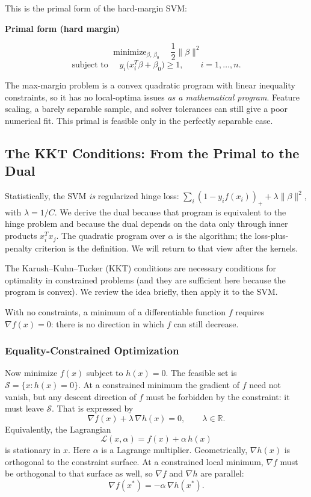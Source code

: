 \documentclass[
]{book}
\begin{document}
This is the primal form of the hard-margin SVM:

\textbf{Primal form (hard margin)}

\[
\operatorname{minimize}_{\beta,\,\beta_0}\quad \frac12\|\beta\|^2
\]
\[
\text{subject to }\quad
y_i\bigl(x_i^T\beta+\beta_0\bigr)\ge 1,\qquad i=1,\ldots,n.
\]

The max-margin problem is a convex quadratic program with linear inequality constraints, so it has no local-optima issues \emph{as a mathematical program}. Feature scaling, a barely separable sample, and solver tolerances can still give a poor numerical fit. This primal is feasible only in the perfectly separable case.

\subsection{The KKT Conditions: From the Primal to the Dual}\label{the-kkt-conditions-from-the-primal-to-the-dual}

Statistically, the SVM \emph{is} regularized hinge loss: \(\sum_i(1-y_i f(x_i))_+ + \lambda\|\beta\|^2\), with \(\lambda=1/C\). We derive the dual because that program is equivalent to the hinge problem and because the dual depends on the data only through inner products \(x_i^T x_j\). The quadratic program over \(\alpha\) is the algorithm; the loss-plus-penalty criterion is the definition. We will return to that view after the kernels.

The Karush--Kuhn--Tucker (KKT) conditions are necessary conditions for optimality in constrained problems (and they are sufficient here because the program is convex). We review the idea briefly, then apply it to the SVM.

With no constraints, a minimum of a differentiable function \(f\) requires \(\nabla f(x)=0\): there is no direction in which \(f\) can still decrease.

\subsubsection*{Equality-Constrained Optimization}\label{equality-constrained-optimization}

Now minimize \(f(x)\) subject to \(h(x)=0\). The feasible set is \(\mathcal{S}=\{x:h(x)=0\}\). At a constrained minimum the gradient of \(f\) need not vanish, but any descent direction of \(f\) must be forbidden by the constraint: it must leave \(\mathcal{S}\). That is expressed by
\[
\nabla f(x) + \lambda\,\nabla h(x) = 0,\qquad \lambda\in\mathbb{R}.
\]
Equivalently, the Lagrangian
\[
\mathcal{L}(x,\alpha) = f(x) + \alpha\, h(x)
\]
is stationary in \(x\). Here \(\alpha\) is a Lagrange multiplier. Geometrically, \(\nabla h(x)\) is orthogonal to the constraint surface. At a constrained local minimum, \(\nabla f\) must be orthogonal to that surface as well, so \(\nabla f\) and \(\nabla h\) are parallel:
\[
\nabla f(x^*) = -\alpha\,\nabla h(x^*).
\]
\end{document}
